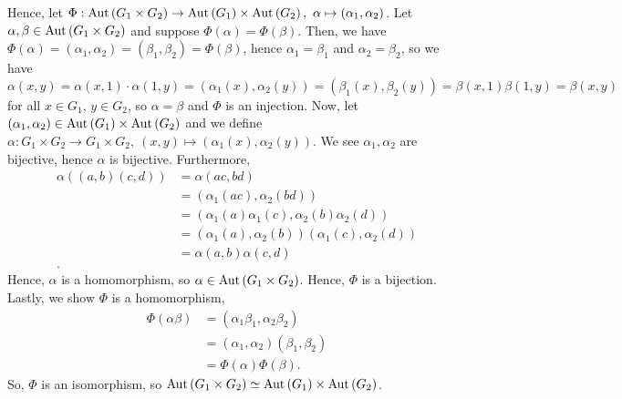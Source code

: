\documentclass[a4paper]{article}
\begin{document}
\begin{solution}
Hence, let \(\Phi : \aut\left( G_1 \times G_2 \right) \to \aut\left( G_1 \right) \times \aut\left( G_2 \right), \ \alpha \mapsto (\alpha_1, \alpha_2) \). Let \(\alpha, \beta \in \operatorname{Aut}\left( G_1 \times G_2 \right)  \)  and suppose \(\Phi\left( \alpha \right)  = \Phi\left( \beta \right) \). Then, we have \(\Phi\left( \alpha \right)  = \left( \alpha_1, \alpha_2 \right) = \left( \beta_1, \beta_2 \right) =\Phi\left( \beta \right) \), hence \(\alpha_1 = \beta_1\) and \(\alpha_2 = \beta_2\), so we have \[\alpha\left( x, y \right)  =\alpha\left( x, 1 \right) \cdot \alpha\left( 1, y \right)  = \left( \alpha_1\left( x \right) , \alpha_2\left( y \right)  \right) = \left( \beta_1\left( x \right), \beta_2\left( y \right)   \right) = \beta\left( x, 1 \right) \beta\left( 1, y \right) = \beta\left( x, y \right)  \] for all \(x \in G_1\), \(y \in G_2\), so \(\alpha  = \beta\) and \(\Phi\) is an injection. Now, let \(\left( \alpha_1, \alpha_2 \right)  \in \operatorname{Aut}\left( G_1 \right) \times \operatorname{Aut}\left( G_2 \right) \) and we define \(\alpha: G_1 \times G_2 \to G_1 \times G_2, \ \left( x, y \right) \mapsto \left( \alpha_1\left( x \right) , \alpha_2\left( y \right)  \right) \). We see \(\alpha_1, \alpha_2\) are bijective, hence \(\alpha\) is bijective. Furthermore,
\begin{align*}
	\alpha\left( \left( a, b \right) \left( c, d \right)  \right) &= \alpha\left( ac, bd \right)  \\
								      &= \left( \alpha_1\left( ac \right) , \alpha_2\left( bd \right)  \right)  \\
								      &= \left( \alpha_1\left( a \right) \alpha_1\left( c \right) , \alpha_2\left( b \right) \alpha_2\left( d \right)  \right)  \\
								      &= \left( \alpha_1\left( a \right) , \alpha_2\left( b \right)  \right) \left( \alpha_1\left( c \right) , \alpha_2\left( d \right)  \right)   \\
								      &= \alpha\left( a, b \right) \alpha\left( c, d \right)  \\
.\end{align*}
Hence, \(\alpha\) is a homomorphism, so \(\alpha \in \operatorname{Aut}\left( G_1 \times G_2 \right) \). Hence, \(\Phi\) is a bijection. Lastly, we show \(\Phi\) is a homomorphism,
\begin{align*}
	\Phi\left( \alpha \beta \right) &= \left( \alpha_1 \beta_1, \alpha_2 \beta_2 \right) 	\\
					&= \left( \alpha_1, \alpha_2 \right) \left( \beta_1, \beta_2 \right)  \\
					&= \Phi\left( \alpha \right) \Phi\left( \beta \right)
.\end{align*}
So, \(\Phi\) is an isomorphism, so \(\operatorname{Aut}\left( G_1 \times G_2 \right) \simeq \operatorname{Aut}\left( G_1 \right) \times \operatorname{Aut}\left( G_2 \right) \).
\end{solution}
\end{document}
